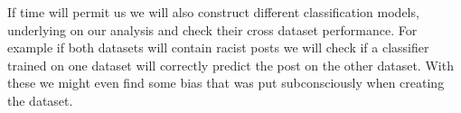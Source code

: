 \documentclass[fleqn,moreauthors,10pt]{ds_report}
\begin{document}
If time will permit us we will also construct different classification models, underlying on our analysis and check their cross dataset performance. For example if both datasets will contain racist posts we will check if a classifier trained on one dataset will correctly predict the post on the other dataset. With these we might even find some bias that was put subconsciously when creating the dataset. 



\end{document}
